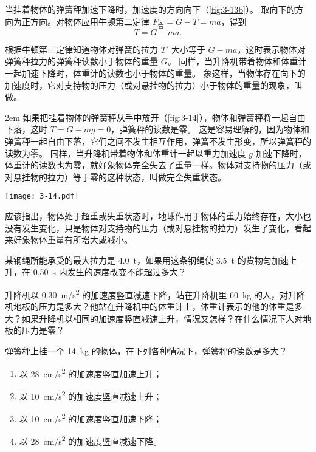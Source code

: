 当挂着物体的弹簧秤加速下降时，加速度的方向向下（\cref{fig:3-13b}）。
取向下的方向为正方向。对物体应用牛顿第二定律 $F_{\text{合}}=G-T=ma$，得到
\[T=G-ma.\]
    
根据牛顿第三定律知道物体对弹簧的拉力 $T'$ 大小等于 $G-ma$，这时表示物体对弹簧秤拉力的弹簧秤读数小于物体的重量 $G$。
同样，当升降机带着物体和体重计一起加速下降时，体重计的读数也小于物体的重量。
象这样，当物体存在向下的加速度时，它对支持物的压力（或对悬挂物的拉力）小于物体的重量的现象，叫做。

\medskip\noindent
\begin{minipage}{0.7\linewidth}\parindent2em
  如果把挂着物体的弹簧秤从手中放开（\cref{fig:3-14}），物体和弹簧秤将一起自由下落，这时 $T=G-mg=0$，弹簧秤的读数是零。
  这是容易理解的，因为物体和弹簧秤一起自由下落，它们之间不发生相互作用，弹簧不发生形变，所以弹簧秤的读数为零。
  同样，当升降机带着物体和体重计一起以重力加速度 $g$ 加速下降时，体重计的读数也为零，就好象物体完全失去了重量一样。物体对支持物的压力（或对悬挂物的拉力）等于零的这种状态，叫做完全失重状态。
\end{minipage}\hfill
\begin{minipage}{0.28\linewidth}\centering
  \begin{figurehere}
    \texttt{[image: 3-14.pdf]}
    \caption{}\label{fig:3-14}
  \end{figurehere}
\end{minipage}

\medskip
应该指出，物体处于超重或失重状态时，地球作用于物体的重力始终存在，大小也没有发生变化，只是物体对支持物的压力（或对悬挂物的拉力）发生了变化，看起来好象物体重量有所增大或减小。

\begin{Practice}
\begin{question}
  \item 某钢绳所能承受的最大拉力是 \qty{4.0}{t}，如果用这条钢绳使 \qty{3.5}{t} 的货物匀加速上升，在 \qty{0.50}{s} 内发生的速度改变不能超过多大？
  \item 升降机以 \qty{0.30}{m/s^2} 的加速度竖直减速下降，站在升降机里 \qty{60}{kg} 的人，对升降机地板的压力是多大？他站在升降机中的体重计上，体重计表示的他的体重是多大？如果升降机以相同的加速度竖直减速上升，情况又怎样？在什么情况下人对地板的压力是零？
  \item 弹簧秤上挂一个 \qty{14}{kg} 的物体，在下列各种情况下，弹簧秤的读数是多大？
  \begin{enumerate}
  \item 以 \qty{28}{cm/s^2} 的加速度竖直加速上升；
  \item 以 \qty{10}{cm/s^2} 的加速度竖直减速上升；
  \item 以 \qty{10}{cm/s^2} 的加速度竖直加速下降；
  \item 以 \qty{28}{cm/s^2} 的加速度竖直减速下降。
  \end{enumerate}
\end{question}
\end{Practice}

